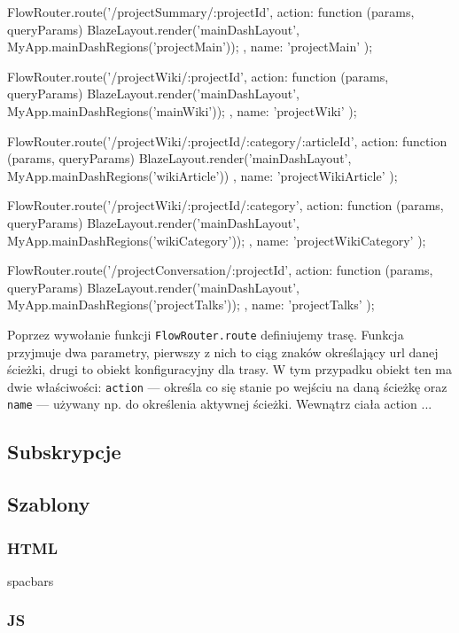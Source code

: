 \begin{js}[caption={Definicja przykładowego routingu},label={lst:routing}]
FlowRouter.route('/projectSummary/:projectId', {
    action: function (params, queryParams) {
        BlazeLayout.render('mainDashLayout', MyApp.mainDashRegions('projectMain'));
    },
    name: 'projectMain'
});

FlowRouter.route('/projectWiki/:projectId', {
    action: function (params, queryParams) {
        BlazeLayout.render('mainDashLayout', MyApp.mainDashRegions('mainWiki'));
    },
    name: 'projectWiki'
});

FlowRouter.route('/projectWiki/:projectId/:category/:articleId', {
    action: function (params, queryParams) {
        BlazeLayout.render('mainDashLayout', MyApp.mainDashRegions('wikiArticle'))
    },
    name: 'projectWikiArticle'
});

FlowRouter.route('/projectWiki/:projectId/:category', {
    action: function (params, queryParams) {
        BlazeLayout.render('mainDashLayout', MyApp.mainDashRegions('wikiCategory'));
    },
    name: 'projectWikiCategory'
});

FlowRouter.route('/projectConversation/:projectId', {
    action: function (params, queryParams) {
        BlazeLayout.render('mainDashLayout', MyApp.mainDashRegions('projectTalks'));
    },
    name: 'projectTalks'
});
\end{js}
Poprzez wywołanie funkcji \verb|FlowRouter.route| definiujemy trasę. Funkcja przyjmuje dwa parametry, pierwszy z nich to ciąg znaków określający url danej ścieżki, drugi to obiekt konfiguracyjny dla trasy. W tym przypadku obiekt ten ma dwie właściwości: \verb|action| --- określa co się stanie po wejściu na daną ścieżkę oraz \verb|name| --- używany np. do określenia aktywnej ścieżki. Wewnątrz ciała action ...



  \subsection{Subskrypcje}
  \subsection{Szablony}
    \subsubsection{HTML}
    spacbars
    \subsubsection{JS}
